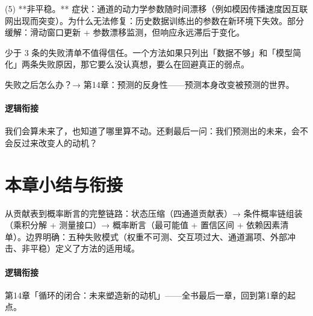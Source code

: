 \documentclass[../../main2.tex]{subfiles}
\begin{document}
	(5) **非平稳。** 症状：通道的动力学参数随时间漂移（例如模因传播速度因互联网出现而突变）。为什么无法修复：历史数据训练出的参数在新环境下失效。部分缓解：滑动窗口更新 + 参数漂移监测，但响应永远滞后于变化。

	少于 3 条的失败清单不值得信任。一个方法如果只列出「数据不够」和「模型简化」两条失败原因，那它要么没认真想，要么在回避真正的弱点。

	\begin{reader_anticipation}
		\item 失败之后怎么办？→ 第14章：预测的反身性——预测本身改变被预测的世界。
	\end{reader_anticipation}

	\paragraph*{逻辑衔接}
	我们会算未来了，也知道了哪里算不动。还剩最后一问：我们预测出的未来，会不会反过来改变人的动机？
	\section{本章小结与衔接}
	\label{sec:fc-summary}
	从贡献表到概率断言的完整链路：状态压缩（四通道贡献表）→ 条件概率链组装（乘积分解 + 测量接口）→ 概率断言（最可能值 + 置信区间 + 依赖因素清单）。边界明确：五种失败模式（权重不可测、交互项过大、通道漏项、外部冲击、非平稳）定义了方法的适用域。

	\paragraph*{逻辑衔接}
	第14章「循环的闭合：未来塑造新的动机」——全书最后一章，回到第1章的起点。
\end{document}
